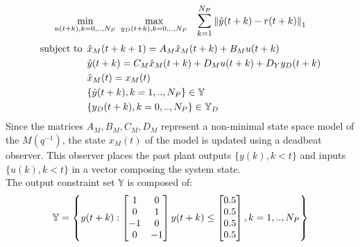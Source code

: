 \documentclass[letterpaper, 10 pt, conference]{ieeeconf}  %
\newcommand{\norm}[1]{\left\lVert#1\right\rVert}
\newcommand{\AB}[1]{\textbf{\color{magenta}{[AB: #1]}}}
\begin{document}
\begin{equation}
\small
\begin{matrix}
\begin{aligned}
\underset{u(t+k),k=0,..,N_P}{\text{min}} \hspace{5pt} \underset{y_D(t+k),k=0,..,N_P}{\text{max}}
&  \hspace{10pt} \mathlarger{\sum\limits_{k=1}^{N_P}}\norm{\hat y(t+k)-r(t+k)}_1 \\ \hspace{-200pt}
\end{aligned} \vspace{-10pt}\\
\begin{aligned}
\text{subject to}
& \hspace{5pt} \hat{x}_M(t+k+1) = A_M\hat{x}_M(t+k) + B_Mu(t+k)\\
& \hspace{5pt} \hat{y}(t+k) = C_M\hat{x}_M(t+k) + D_Mu(t+k)+D_Yy_D(t+k) \\
& \hspace{5pt} \hat{x}_M(t)=x_M(t) \\
& \hspace{5pt} \{\hat{y}(t+k),k=1,..,N_P\} \in \mathbb{Y} \\
& \hspace{5pt} \{y_D(t+k),k=0,..,N_P\} \in \mathbb{Y}_D
\end{aligned}
\end{matrix}
\label{RMPC_YD_minmax}
\end{equation}
Since the matrices $A_M,B_M,C_M,D_M$ represent a non-minimal state space model of the $M(q^{-1})$, the state $x_M(t)$ of the model is updated using a deadbeat observer. This observer places the past plant outputs $\{y(k),k<t\}$ and inputs $\{u(k),k<t\}$ in a vector composing the system state.\\
 The output constraint set $\mathbb{Y}$ is composed of:
 \begin{equation}
 \small
 \mathbb{Y}=\begin{Bmatrix}y(t+k):\begin{bmatrix} 1 & 0 \\ 0 & 1 \\ -1 & 0 \\ 0 & -1 \end{bmatrix} y(t+k) \leq \begin{bmatrix} 0.5 \\ 0.5 \\ 0.5 \\ 0.5 \end{bmatrix}, k=1,..,N_P\end{Bmatrix}
 \end{equation}
\end{document}
